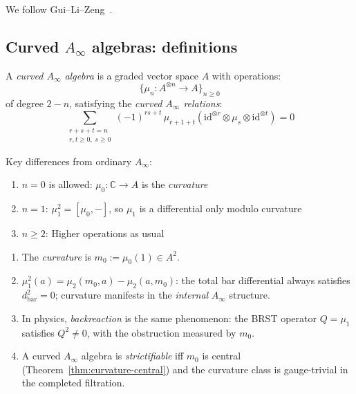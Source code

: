 We follow Gui--Li--Zeng~\cite{GLZ22}.

\subsection{Curved $A_\infty$ algebras: definitions}
\label{sec:curved-ainfty-definition}

\begin{definition}
\label{def:curved-ainfty}
A \emph{curved $A_\infty$ algebra} is a graded vector space $A$ with operations:
\begin{equation}
\{\mu_n: A^{\otimes n} \to A\}_{n \geq 0}
\end{equation}
of degree $2-n$, satisfying the \emph{curved $A_\infty$ relations}:
\begin{equation}\label{eq:curved-ainfty-relations}
\sum_{\substack{r+s+t=n \\ r,t \geq 0,\; s \geq 0}} (-1)^{rs+t}\, \mu_{r+1+t}(\mathrm{id}^{\otimes r} \otimes \mu_s \otimes \mathrm{id}^{\otimes t}) = 0
\end{equation}

Key differences from ordinary $A_\infty$:
\begin{enumerate}
\item $n=0$ is allowed: $\mu_0: \mathbb{C} \to A$ is the \emph{curvature}
\item $n=1$: $\mu_1^2 = [\mu_0, -]$, so $\mu_1$ is a differential only modulo curvature
\item $n \geq 2$: Higher operations as usual
\end{enumerate}
\end{definition}

\begin{remark}\label{rem:curvature-backreaction-terminology}
\begin{enumerate}[label=(\roman*)]
\item The \emph{curvature} is $m_0 := \mu_0(1) \in A^2$.
\item $\mu_1^2(a) = \mu_2(m_0, a) - \mu_2(a, m_0)$: the total bar differential always satisfies $d_{\mathrm{bar}}^2 = 0$; curvature manifests in the \emph{internal} $A_\infty$ structure.
\item In physics, \emph{backreaction} is the same phenomenon: the BRST operator $Q = \mu_1$ satisfies $Q^2 \neq 0$, with the obstruction measured by $m_0$.
\item A curved $A_\infty$ algebra is \emph{strictifiable} iff $m_0$ is central (Theorem~\ref{thm:curvature-central}) and the curvature class is gauge-trivial in the completed filtration.
\end{enumerate}
\end{remark}

